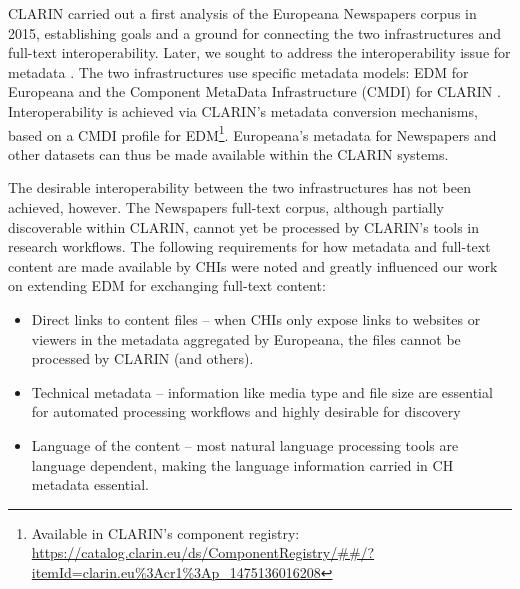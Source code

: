\documentclass[a4paper,UKenglish,cleveref, autoref]{oasics-v2019}
\begin{document}
CLARIN carried out a first analysis of the Europeana Newspapers corpus in 2015, establishing goals and a ground for connecting the two infrastructures and full-text interoperability. Later, we sought to address the interoperability issue for metadata \cite{Goosen17}. The two infrastructures use specific metadata models: EDM for Europeana and the Component MetaData Infrastructure (CMDI) for CLARIN \cite{cmdi}. Interoperability is achieved via CLARIN's metadata conversion mechanisms, based on a CMDI profile for 
EDM\footnote{Available in CLARIN’s component registry:  \url{https://catalog.clarin.eu/ds/ComponentRegistry/##/?itemId=clarin.eu\%3Acr1\%3Ap_1475136016208}}.
Europeana's metadata for Newspapers and other datasets can thus be made available within the CLARIN systems. 

The desirable interoperability between the two infrastructures has not been achieved, however. The Newspapers full-text corpus, although partially discoverable within CLARIN, cannot yet be processed by CLARIN's tools in research workflows. The following requirements for how metadata and full-text content are made available by CHIs were noted and greatly influenced our work on extending EDM for exchanging full-text content:
\begin{itemize}
\item Direct links to content files – when CHIs only expose links to websites or viewers in the metadata aggregated by Europeana, the files cannot be processed by CLARIN (and others).
\item Technical metadata – information like media type and file size are essential for automated processing workflows and highly desirable for discovery
\item Language of the content – most natural language processing tools are language dependent, making the language information carried in CH metadata essential.
\end{itemize}
\end{document}
